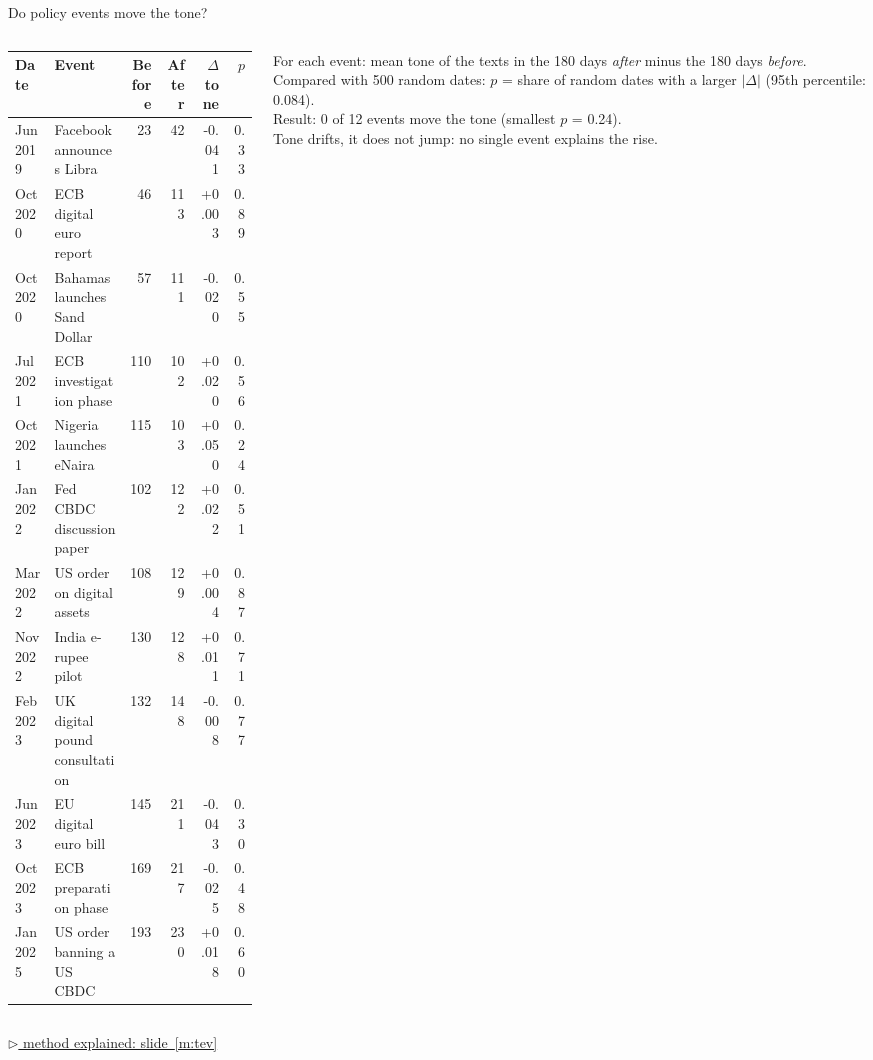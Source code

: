 \documentclass[aspectratio=169,10pt]{beamer}
\newcommand{\method}[1]{\hfill\hyperref[#1]{\tiny\textcolor{c4}{$\triangleright$ method explained: slide~\ref*{#1}}}}
\begin{document}
\begin{frame}{Do policy events move the tone?}
\begin{columns}[T]
\begin{column}{0.6\textwidth}\scriptsize
\setlength{\tabcolsep}{3pt}
\begin{tabular}{@{}llrrrr@{}}\toprule
\textbf{Date} & \textbf{Event} & \textbf{Before} & \textbf{After} & $\Delta$\textbf{tone} & $p$\\\midrule
Jun 2019 & Facebook announces Libra & 23 & 42 & -0.041 & 0.33 \\
Oct 2020 & ECB digital euro report & 46 & 113 & +0.003 & 0.89 \\
Oct 2020 & Bahamas launches Sand Dollar & 57 & 111 & -0.020 & 0.55 \\
Jul 2021 & ECB investigation phase & 110 & 102 & +0.020 & 0.56 \\
Oct 2021 & Nigeria launches eNaira & 115 & 103 & +0.050 & 0.24 \\
Jan 2022 & Fed CBDC discussion paper & 102 & 122 & +0.022 & 0.51 \\
Mar 2022 & US order on digital assets & 108 & 129 & +0.004 & 0.87 \\
Nov 2022 & India e-rupee pilot & 130 & 128 & +0.011 & 0.71 \\
Feb 2023 & UK digital pound consultation & 132 & 148 & -0.008 & 0.77 \\
Jun 2023 & EU digital euro bill & 145 & 211 & -0.043 & 0.30 \\
Oct 2023 & ECB preparation phase & 169 & 217 & -0.025 & 0.48 \\
Jan 2025 & US order banning a US CBDC & 193 & 230 & +0.018 & 0.60 \\
\bottomrule\end{tabular}
\end{column}
\begin{column}{0.38\textwidth}\small
For each event: mean tone of the texts in the 180 days \emph{after} minus the 180 days \emph{before}. Compared with 500 random dates: $p$ = share of random dates with a larger $|\Delta|$ (95th percentile: 0.084).\\[6pt]
\alert{Result}: 0 of 12 events move the tone (smallest $p$ = 0.24).\\[4pt]
Tone \alert{drifts}, it does not \alert{jump}: no single event explains the rise.
\end{column}
\end{columns}
\method{m:tev}
\end{frame}
\end{document}
